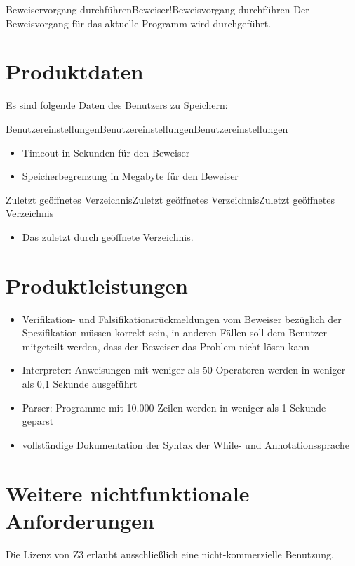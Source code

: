 \documentclass[a4paper,10pt]{article}
\begin{document}
\begin{FA}{Beweiservorgang durchf\"{u}hren}{Beweiser!Beweisvorgang durchf\"{u}hren}
Der Beweisvorgang f\"{u}r das aktuelle Programm wird durchgef\"{u}hrt.
\end{FA}

\section{Produktdaten}
Es sind folgende Daten des Benutzers zu Speichern:\\
\begin{PD}{Benutzereinstellungen}{Benutzereinstellungen}{Benutzereinstellungen}
\begin{itemize}
  \item Timeout in Sekunden f\"{u}r den Beweiser
  \item Speicherbegrenzung in Megabyte f\"{u}r den Beweiser
\end{itemize}
\end{PD}
\begin{PD}{Zuletzt ge\"{o}ffnetes Verzeichnis}{Zuletzt ge\"{o}ffnetes Verzeichnis}{Zuletzt ge\"{o}ffnetes Verzeichnis}
\begin{itemize}
  \item Das zuletzt durch  ge\"{o}ffnete Verzeichnis.
\end{itemize}
\end{PD}

\section{Produktleistungen}
\begin{itemize}
  \item Verifikation- und Falsifikationsr\"{u}ckmeldungen vom Beweiser bezüglich der Spezifikation m\"{u}ssen korrekt sein, in anderen F\"{a}llen soll dem Benutzer mitgeteilt werden, dass der Beweiser das Problem nicht l\"{o}sen kann
  \item Interpreter: Anweisungen mit weniger als 50 Operatoren werden in weniger als 0,1 Sekunde ausgeführt
  \item Parser: Programme mit 10.000 Zeilen werden in weniger als 1 Sekunde geparst
  \item vollständige Dokumentation der Syntax der While- und Annotationssprache
\end{itemize}

\section{Weitere nichtfunktionale Anforderungen}
Die Lizenz von Z3 erlaubt ausschlie\ss{}lich eine nicht-kommerzielle Benutzung.
\end{document}
